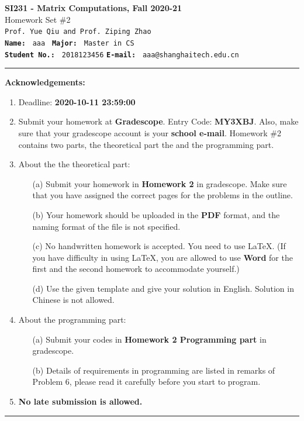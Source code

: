 \documentclass[english,onecolumn]{IEEEtran}
\begin{document}
\begin{center}
	\textbf{{\Large SI231 - Matrix Computations, Fall 2020-21}}\\
	Homework Set \#2\\
   \texttt{Prof. Yue Qiu and Prof. Ziping Zhao} \\
	\texttt{\textbf{Name:}}   	\texttt{ aaa }  		\hspace{1bp}
	\texttt{\textbf{Major:}}  	\texttt{ Master in CS } 	\\
	\texttt{\textbf{Student No.:}} 	\texttt{ 2018123456}     \hspace{1bp}
	\texttt{\textbf{E-mail:}} 	\texttt{ aaa@shanghaitech.edu.cn}
\par\end{center}


\noindent
\rule{\linewidth}{0.4pt}
{\bf {\large Acknowledgements:}}
\begin{enumerate}
    \item Deadline: \textbf{2020-10-11 23:59:00}
    \item Submit your homework at \textbf{Gradescope}. Entry Code: \textbf{MY3XBJ}. Also, make sure that your gradescope account is your \textbf{school e-mail}.
    Homework \#2 contains two parts, the theoretical part the and the programming part.
    \item About the the theoretical part:
    \begin{enumerate}
            \item[(a)] Submit your homework in \textbf{Homework 2} in gradescope. Make sure that you have assigned the correct pages for the problems in the outline.
            \item[(b)] Your homework should be uploaded in the \textbf{PDF} format, and the naming format of the file is not specified.
            \item[(c)] No handwritten homework is accepted. You need to use \LaTeX. (If you have difficulty in using \LaTeX, you are allowed to use \textbf{Word} for the first and the second homework to accommodate yourself.)
            \item[(d)] Use the given template and give your solution in English. Solution in Chinese is not allowed. 
        \end{enumerate}
  \item About the programming part:
  \begin{enumerate}
      \item[(a)] Submit your codes in \textbf{Homework 2 Programming part} in gradescope.
      \item[(b)] Details of requirements in programming are listed in remarks of Problem 6, please read it carefully before you start to program.
  \end{enumerate}
  \item \textbf{No late submission is allowed.}
\end{enumerate}
\rule{\linewidth}{0.4pt}
\newpage 
\end{document}
